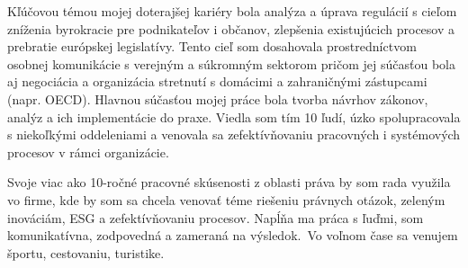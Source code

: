

\begin{cvparagraph}

Kľúčovou témou mojej doterajšej kariéry bola analýza a úprava regulácií s cieľom zníženia byrokracie pre podnikateľov i občanov, zlepšenia existujúcich procesov a prebratie európskej legislatívy. Tento cieľ som dosahovala prostredníctvom osobnej komunikácie s verejným a súkromným sektorom pričom jej súčasťou bola aj negociácia a organizácia stretnutí s domácimi a zahraničnými zástupcami (napr. OECD). Hlavnou súčasťou mojej práce bola tvorba návrhov zákonov, analýz a ich implementácie do praxe. Viedla som tím 10 ľudí, úzko spolupracovala s niekoľkými oddeleniami a venovala sa zefektívňovaniu pracovných i systémových procesov v rámci organizácie.

Svoje viac ako 10-ročné pracovné skúsenosti z oblasti práva by som rada využila vo firme, kde by som sa chcela venovať téme riešeniu právnych otázok, zeleným inováciám, ESG a zefektívňovaniu procesov. Napĺňa ma práca s ľuďmi, som komunikatívna, zodpovedná a zameraná na výsledok. Vo voľnom čase sa venujem športu, cestovaniu, turistike.
\end{cvparagraph}
